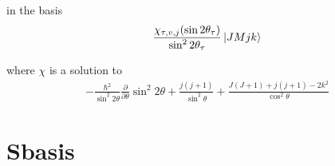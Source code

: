 \documentclass[aps,pra,onecolumn,showpacs,floatfix]{revtex4}
\begin{document}
in the basis
\begin{align}\label{eqn:delves}
	\frac{\chi_{\tau,v,j}(\sin{2\theta_\tau})}{\sin^2{2\theta_\tau}}\ket{JMjk}
\end{align}

where $\chi$ is a solution to
\begin{align}\label{eqn:delves}
	-\frac{\hbar^2}{\sin^2{2\theta}}\frac{\partial}{\partial\theta}\sin^2{2\theta} + \frac{j(j+1)}{\sin^2\theta} + \frac{J(J+1)+j(j+1)-2k^2}{\cos^2\theta}
\end{align}

\section{Sbasis}
\begin{acknowledgments}
\end{acknowledgments}


\end{document}
